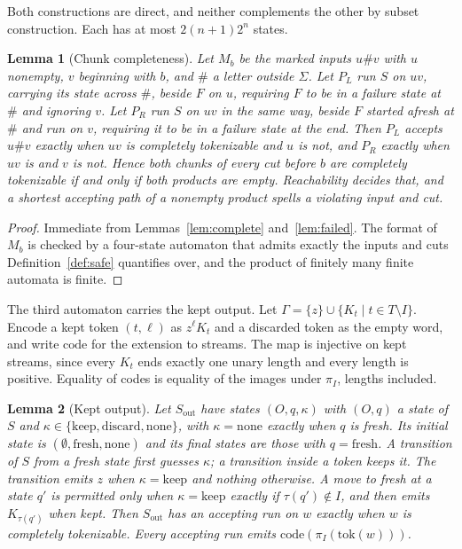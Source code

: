 \documentclass[11pt,a4paper]{article}
\theoremstyle{definition}
\theoremstyle{plain}
\newtheorem{lemma}{Lemma}
\begin{document}
Both constructions are direct, and neither complements the other by subset construction. Each has at most $2(n + 1)2^n$
states.

\begin{lemma}[Chunk completeness]
\label{lem:chunks}
Let $M_b$ be the marked inputs $u \# v$ with $u$ nonempty, $v$ beginning with $b$, and $\#$ a letter outside $\Sigma$.
Let $P_L$ run $S$ on $uv$, carrying its state across $\#$, beside $F$ on $u$, requiring $F$ to be in a failure state at
$\#$ and ignoring $v$. Let $P_R$ run $S$ on $uv$ in the same way, beside $F$ started afresh at $\#$ and run on $v$,
requiring it to be in a failure state at the end. Then $P_L$ accepts $u \# v$ exactly when $uv$ is completely
tokenizable and $u$ is not, and $P_R$ exactly when $uv$ is and $v$ is not. Hence both chunks of every cut before $b$ are
completely tokenizable if and only if both products are empty. Reachability decides that, and a shortest accepting path
of a nonempty product spells a violating input and cut.
\end{lemma}

\begin{proof}
Immediate from Lemmas~\ref{lem:complete} and~\ref{lem:failed}. The format of $M_b$ is checked by a four-state automaton
that admits exactly the inputs and cuts Definition~\ref{def:safe} quantifies over, and the product of finitely many
finite automata is finite.
\end{proof}

The third automaton carries the kept output. Let $\Gamma = \{z\} \cup \{K_t \mid t \in T \setminus I\}$. Encode a kept
token $(t, \ell)$ as $z^\ell K_t$ and a discarded token as the empty word, and write $\mathrm{code}$ for the extension
to streams. The map is injective on kept streams, since every $K_t$ ends exactly one unary length and every length is
positive. Equality of codes is equality of the images under $\pi_I$, lengths included.

\begin{lemma}[Kept output]
\label{lem:output}
Let $S_{\mathrm{out}}$ have states $(O, q, \kappa)$ with $(O, q)$ a state of $S$ and
$\kappa \in \{\mathrm{keep}, \mathrm{discard}, \mathrm{none}\}$, with $\kappa = \mathrm{none}$ exactly when $q$ is
fresh. Its initial state is $(\emptyset, \mathrm{fresh}, \mathrm{none})$ and its final states are those with
$q = \mathrm{fresh}$. A transition of $S$ from a fresh state first guesses $\kappa$; a transition inside a token keeps
it. The transition emits $z$ when $\kappa = \mathrm{keep}$ and nothing otherwise. A move to fresh at a state $q'$ is
permitted only when $\kappa = \mathrm{keep}$ exactly if $\tau(q') \notin I$, and then emits $K_{\tau(q')}$ when kept.
Then $S_{\mathrm{out}}$ has an accepting run on $w$ exactly when $w$ is completely tokenizable. Every accepting run
emits $\mathrm{code}(\pi_I(\mathrm{tok}(w)))$.
\end{lemma}
\end{document}
